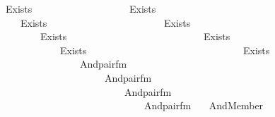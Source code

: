 \begin{isabellebody}
\ \ \ \ \ \ \ \ \ \ \ \ \ \ \ \ \ \ Exists\isanewline
\ \ \ \ \ \ \ \ \ \ \ \ \ \ \ \ \ \ \ {\isacharparenleft}{\kern0pt}Exists\isanewline
\ \ \ \ \ \ \ \ \ \ \ \ \ \ \ \ \ \ \ \ \ {\isacharparenleft}{\kern0pt}Exists\isanewline
\ \ \ \ \ \ \ \ \ \ \ \ \ \ \ \ \ \ \ \ \ \ \ {\isacharparenleft}{\kern0pt}Exists\isanewline
\ \ \ \ \ \ \ \ \ \ \ \ \ \ \ \ \ \ \ \ \ \ \ \ \ {\isacharparenleft}{\kern0pt}Exists\isanewline
\ \ \ \ \ \ \ \ \ \ \ \ \ \ \ \ \ \ \ \ \ \ \ \ \ \ \ {\isacharparenleft}{\kern0pt}Exists\isanewline
\ \ \ \ \ \ \ \ \ \ \ \ \ \ \ \ \ \ \ \ \ \ \ \ \ \ \ \ \ {\isacharparenleft}{\kern0pt}Exists\isanewline
\ \ \ \ \ \ \ \ \ \ \ \ \ \ \ \ \ \ \ \ \ \ \ \ \ \ \ \ \ \ \ {\isacharparenleft}{\kern0pt}Exists\isanewline
\ \ \ \ \ \ \ \ \ \ \ \ \ \ \ \ \ \ \ \ \ \ \ \ \ \ \ \ \ \ \ \ \ {\isacharparenleft}{\kern0pt}And{\isacharparenleft}{\kern0pt}pair{\isacharunderscore}{\kern0pt}fm{\isacharparenleft}{\kern0pt}{}{\isacharcomma}{\kern0pt}\ {}{\isacharcomma}{\kern0pt}\ {}{\isacharparenright}{\kern0pt}{\isacharcomma}{\kern0pt}\isanewline
\ \ \ \ \ \ \ \ \ \ \ \ \ \ \ \ \ \ \ \ \ \ \ \ \ \ \ \ \ \ \ \ \ \ \ \ \ \ And{\isacharparenleft}{\kern0pt}pair{\isacharunderscore}{\kern0pt}fm{\isacharparenleft}{\kern0pt}{}{\isacharcomma}{\kern0pt}\ {}{\isacharcomma}{\kern0pt}\ {}{}{\isacharparenright}{\kern0pt}{\isacharcomma}{\kern0pt}\isanewline
\ \ \ \ \ \ \ \ \ \ \ \ \ \ \ \ \ \ \ \ \ \ \ \ \ \ \ \ \ \ \ \ \ \ \ \ \ \ \ \ \ \ And{\isacharparenleft}{\kern0pt}pair{\isacharunderscore}{\kern0pt}fm{\isacharparenleft}{\kern0pt}{}{\isacharcomma}{\kern0pt}\ {}{\isacharcomma}{\kern0pt}\ {}{\isacharparenright}{\kern0pt}{\isacharcomma}{\kern0pt}\isanewline
\ \ \ \ \ \ \ \ \ \ \ \ \ \ \ \ \ \ \ \ \ \ \ \ \ \ \ \ \ \ \ \ \ \ \ \ \ \ \ \ \ \ \ \ \ \ And{\isacharparenleft}{\kern0pt}pair{\isacharunderscore}{\kern0pt}fm{\isacharparenleft}{\kern0pt}{}{\isacharcomma}{\kern0pt}\ {}{\isacharcomma}{\kern0pt}\ {}{\isacharparenright}{\kern0pt}{\isacharcomma}{\kern0pt}\isanewline
\ And{\isacharparenleft}{\kern0pt}Member{\isacharparenleft}{\kern0pt}{}{\isacharcomma}{\kern0pt}\ {}{\isacharparenright}{\kern0pt}{\isacharcomma}{\kern0pt}\isanewline

\end{isabellebody}
